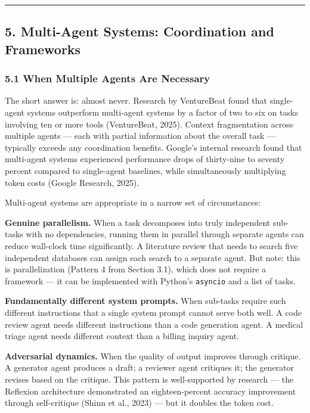 \documentclass[11pt, a4paper]{article}
\newcommand{\passthrough}[1]{#1}
\begin{document}
\begin{center}\rule{0.5\linewidth}{0.5pt}\end{center}

\hypertarget{multi-agent-systems-coordination-and-frameworks}{%
\subsection{5. Multi-Agent Systems: Coordination and
Frameworks}\label{multi-agent-systems-coordination-and-frameworks}}

\hypertarget{when-multiple-agents-are-necessary}{%
\subsubsection{5.1 When Multiple Agents Are
Necessary}\label{when-multiple-agents-are-necessary}}

The short answer is: almost never. Research by VentureBeat found that
single-agent systems outperform multi-agent systems by a factor of two
to six on tasks involving ten or more tools (VentureBeat, 2025). Context
fragmentation across multiple agents --- each with partial information
about the overall task --- typically exceeds any coordination benefits.
Google's internal research found that multi-agent systems experienced
performance drops of thirty-nine to seventy percent compared to
single-agent baselines, while simultaneously multiplying token costs
(Google Research, 2025).

Multi-agent systems are appropriate in a narrow set of circumstances:

\textbf{Genuine parallelism.} When a task decomposes into truly
independent sub-tasks with no dependencies, running them in parallel
through separate agents can reduce wall-clock time significantly. A
literature review that needs to search five independent databases can
assign each search to a separate agent. But note: this is
parallelization (Pattern 4 from Section 3.1), which does not require a
framework --- it can be implemented with Python's
\passthrough{\lstinline!asyncio!} and a list of tasks.

\textbf{Fundamentally different system prompts.} When sub-tasks require
such different instructions that a single system prompt cannot serve
both well. A code review agent needs different instructions than a code
generation agent. A medical triage agent needs different context than a
billing inquiry agent.

\textbf{Adversarial dynamics.} When the quality of output improves
through critique. A generator agent produces a draft; a reviewer agent
critiques it; the generator revises based on the critique. This pattern
is well-supported by research --- the Reflexion architecture
demonstrated an eighteen-percent accuracy improvement through
self-critique (Shinn et al., 2023) --- but it doubles the token cost.
\end{document}
